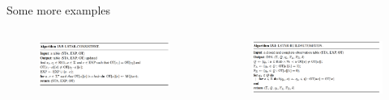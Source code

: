 \documentclass[aspectratio=169,xcolor=dvipsnames]{beamer}
\begin{document}
\begin{frame}{Some more examples}
{\begin{columns}
    \begin{figure}
        \centering
        \includegraphics[width=\linewidth]{images/alg13_5.png}
    \end{figure}

    \begin{figure}
        \centering
        \includegraphics[width=\linewidth]{images/alg13_1.png}
    \end{figure}
\end{columns}
}


\end{frame}





%     
%     
\end{document}
